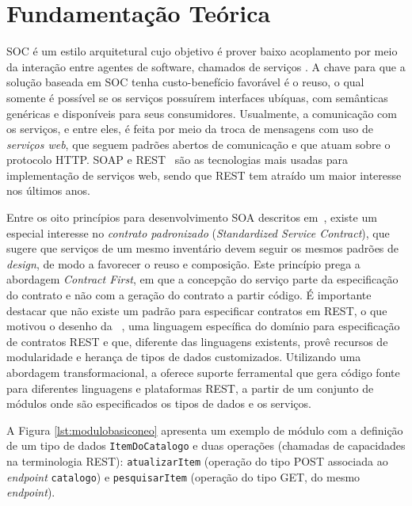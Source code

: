 
\section{Fundamentação Teórica}\label{sec:fundamentacao}

SOC é um estilo arquitetural cujo objetivo é prover baixo acoplamento por meio
da interação entre agentes de software, chamados de serviços
\cite{he2003service}. A chave para que a solução baseada em SOC tenha
custo-benefício favorável é o reuso, o qual somente é possível se os serviços
possuírem interfaces ubíquas, com semânticas genéricas e disponíveis para seus
consumidores. Usualmente, a comunicação com os serviços, e entre eles, é feita
por meio da troca de mensagens com uso de \textit{servi\c cos web}, que seguem
padrões abertos de comunicação e que atuam sobre o protocolo HTTP. SOAP e
REST~\cite{fielding2000fielding} s\~{a}o as tecnologias mais usadas para
implementa\c c\~{a}o de servi\c cos web, sendo que REST tem atra\'{i}do um maior
interesse nos \'{u}ltimos anos.

Entre os oito princípios para desenvolvimento SOA descritos
em~\cite{erl2008soa}, existe um especial interesse no \emph{contrato
padronizado} (\textit{Standardized Service Contract}), que sugere que serviços
de um mesmo inventário devem seguir os mesmos padrões de \textit{design}, de
modo a favorecer o reuso e composição. Este princípio prega a abordagem
\textit{Contract First}, em que a concepção do serviço parte da especificação do
contrato e não com a geração do contrato a partir código. \'{E} importante
destacar que n\~{a}o existe um padr\~{a}o para especificar contratos em REST, o
que motivou o desenho da \neoidl~\cite{bonifacio2015neoidl}, uma linguagem
espec\'{i}fica do dom\'{i}nio para especificação de contratos REST e que,
diferente das linguagens existents, prov\^{e} recursos de modularidade e herança
de tipos de dados customizados. Utilizando uma abordagem transformacional, a
\neoidl{} oferece suporte ferramental que gera c\'{o}digo fonte para diferentes
linguagens e plataformas REST, a partir de um conjunto de módulos \neoidl{} onde
são especificados os tipos de dados e os serviços.

A Figura \ref{lst:modulobasiconeo} apresenta um exemplo de módulo \neoidl{}
com a defini\c c\~{a}o de um tipo de dados \texttt{ItemDoCatalogo} e duas
opera\c c\~{o}es (chamadas de capacidades na terminologia REST):
\texttt{atualizarItem} (opera\c c\~{a}o do tipo POST associada ao
\emph{endpoint} \texttt{catalogo}) e \texttt{pesquisarItem} (opera\c c\~{a}o do
tipo GET, do mesmo \emph{endpoint}).



